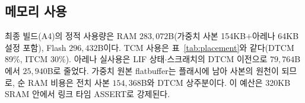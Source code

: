 \subsection{메모리 사용}

최종 빌드(A4)의 정적 사용량은 RAM $283{,}072$B(가중치 사본
154KB$+$아레나 64KB 설정 포함), Flash $296{,}432$B이다. TCM 사용은
표~\ref{tab:placement}와 같다(DTCM 89\%, ITCM 30\%). 아레나 실사용은
LIF 상태$\cdot$스크래치의 DTCM 이전으로 $79{,}764$B에서
$25{,}940$B로 줄었다. 가중치 원본 flatbuffer는 플래시에 남아 사본의
원천이 되므로, 순 RAM 비용은 전치 사본 $154{,}368$B와 DTCM
상주분이다. 이 예산은 320KB SRAM 안에서 링크 타임 ASSERT로
강제된다.
